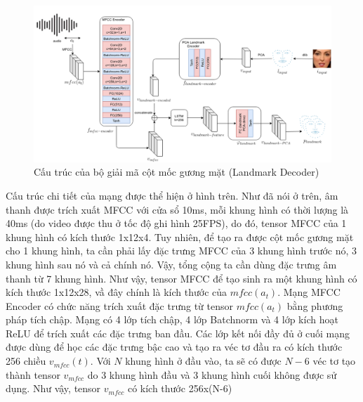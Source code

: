 \begin{figure}[H]
    \centering
    \includegraphics[width=15cm]{./content/materials/landmark_decoder.png}
    \caption{Cấu trúc của bộ giải mã cột mốc gương mặt (Landmark Decoder)}
\end{figure}

Cấu trúc chi tiết của mạng được thể hiện ở hình trên. Như đã nói ở trên, âm thanh được trích xuất MFCC với cửa sổ 10ms, mỗi khung hình có thời lượng là 40ms (do video được thu ở tốc độ ghi hình 25FPS), do đó, tensor MFCC của 1 khung hình có kích thước 1x12x4. Tuy nhiên, để tạo ra được cột mốc gương mặt cho 1 khung hình, ta cần phải lấy đặc trưng MFCC của 3 khung hình trước nó, 3 khung hình sau nó và cả chính nó. Vậy, tổng cộng ta cần dùng đặc trưng âm thanh từ 7 khung hình. Như vậy, tensor MFCC để tạo sinh ra một khung hình có kích thước 1x12x28, vầ đây chính là kích thước của $mfcc(a_t)$. Mạng MFCC Encoder có chức năng trích xuất đặc trưng từ tensor $mfcc(a_t)$ bằng phương pháp tích chập. Mạng có 4 lớp tích chập, 4 lớp Batchnorm và 4 lớp kích hoạt ReLU để trích xuất các đặc trưng ban đầu. Các lớp kết nối đầy đủ ở cuối mạng được dùng để học các đặc trưng bậc cao và tạo ra véc tơ đầu ra có kích thước 256 chiều $v_{mfcc}(t)$. Với $N$ khung hình ở đầu vào, ta sẽ có được $N-6$ véc tơ tạo thành tensor $v_{mfcc}$ do 3 khung hình đầu và 3 khung hình cuối không được sử dụng. Như vậy, tensor $v_{mfcc}$ có kích thước 256x(N-6)

